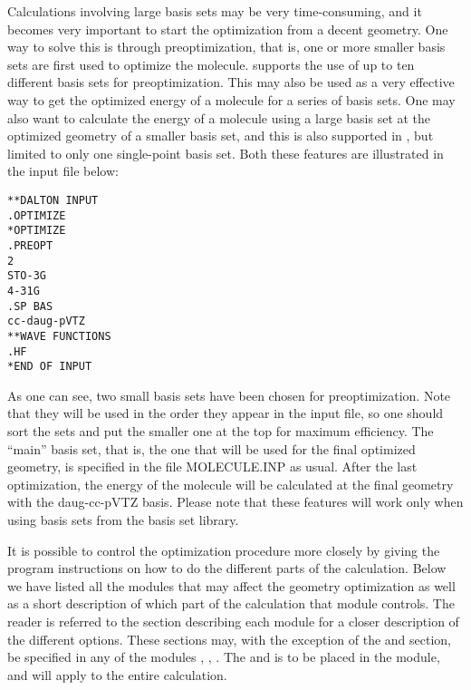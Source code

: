 Calculations involving large basis sets may be very time-consuming,
and it becomes very important to start the optimization from a decent
geometry. One way to solve this is through
preoptimization, that is,
one or more smaller basis sets are first used to optimize the
molecule.  supports the use of up to ten different
basis sets for preoptimization. This may also be used as a very
effective way to get the optimized energy of a molecule for a series
of basis sets. One may also want to calculate the energy of a molecule
using a large basis set at the optimized geometry of a smaller basis
set, and this is also supported in {\dalton}, but limited to only one
single-point basis set. Both these features are illustrated in the
input file below:

\begin{verbatim}
**DALTON INPUT
.OPTIMIZE
*OPTIMIZE
.PREOPT
2
STO-3G
4-31G
.SP BAS
cc-daug-pVTZ
**WAVE FUNCTIONS
.HF
*END OF INPUT
\end{verbatim}

As one can see, two small basis sets have been chosen for
preoptimization. Note that they will be
used in the order they appear in the input file, so one should
sort the sets and put the smaller one at the top for maximum
efficiency. The ``main'' basis set, that is, the one that will be
used for the final optimized geometry, is specified in the file
MOLECULE.INP as usual. After the last optimization, the energy of
the molecule will be calculated at the final geometry with the
daug-cc-pVTZ basis. Please note that these features will work only
when using basis sets from the basis set library.

It is possible to control the optimization procedure more closely
by giving the program instructions on how to do the different parts of
the calculation. Below we have listed all the modules that may
affect the geometry optimization  as well as a short description of
which part of the calculation that module controls. The reader is
referred to the section describing each module for a closer
description of the different options. These sections may, with the
exception of the  and  section, be specified
in any of the modules , ,
. The  and  is
to be placed in the  module, and will apply to the
entire calculation.

